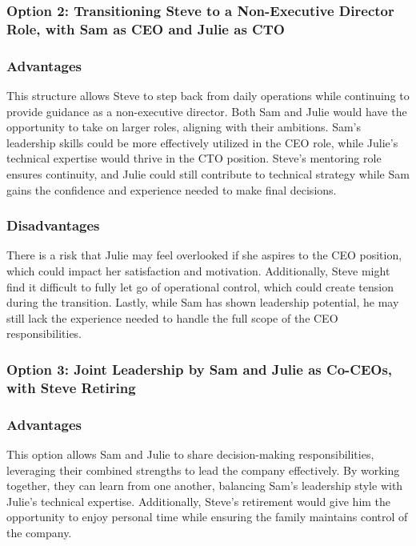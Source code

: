 \documentclass[a4paper,10pt]{article}
\begin{document}
\subsubsection*{Option 2: Transitioning Steve to a Non-Executive Director Role, with Sam as CEO and Julie as CTO}

\subsubsection*{Advantages}
This structure allows Steve to step back from daily operations while continuing to provide guidance as a non-executive director. Both Sam and Julie would have the opportunity to take on larger roles, aligning with their ambitions. Sam’s leadership skills could be more effectively utilized in the CEO role, while Julie’s technical expertise would thrive in the CTO position. Steve’s mentoring role ensures continuity, and Julie could still contribute to technical strategy while Sam gains the confidence and experience needed to make final decisions.

\subsubsection*{Disadvantages}
There is a risk that Julie may feel overlooked if she aspires to the CEO position, which could impact her satisfaction and motivation. Additionally, Steve might find it difficult to fully let go of operational control, which could create tension during the transition. Lastly, while Sam has shown leadership potential, he may still lack the experience needed to handle the full scope of the CEO responsibilities.

\subsubsection*{Option 3: Joint Leadership by Sam and Julie as Co-CEOs, with Steve Retiring}

\subsubsection*{Advantages}
This option allows Sam and Julie to share decision-making responsibilities, leveraging their combined strengths to lead the company effectively. By working together, they can learn from one another, balancing Sam’s leadership style with Julie’s technical expertise. Additionally, Steve’s retirement would give him the opportunity to enjoy personal time while ensuring the family maintains control of the company.
\end{document}

